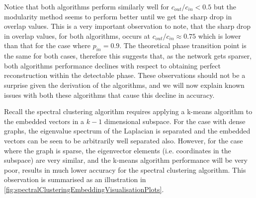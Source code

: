 Notice that both algorithms perform similarly well for $c_{out}/c_{in} < 0.5$ but the modularity method seems to perform better until we get the sharp drop in overlap values.
This is a very important observation to note, that the sharp drop in overlap values, for both algorithms, occurs at $c_{out}/c_{in} \approx 0.75$ which is lower than that for the case where $p_{in}=0.9$.
The theoretical phase transition point is the same for both cases, therefore this suggests that, as the network gets sparser, both algorithms performance declines with respect to obtaining perfect reconstruction within the detectable phase.
These observations should not be a surprise given the derivation of the algorithms, and we will now explain known issues with both these algorithms that cause this decline in accuracy.

Recall the spectral clustering algorithm requires applying a k-means algorithm to the embedded vectors in a $k-1$ dimensional subspace.
For the case with dense graphs, the eigenvalue spectrum of the Laplacian is separated and the embedded vectors can be seen to be arbitrarily well separated also.
However, for the case where the graph is sparse, the eigenvector elements (i.e. coordinates in the subspace) are very similar, and the k-means algorithm performance will be very poor, results in much lower accuracy for the spectral clustering algorithm.
This observation is summarised as an illustration in \cref{fig:spectralClusteringEmbeddingVisualisationPlots}.


